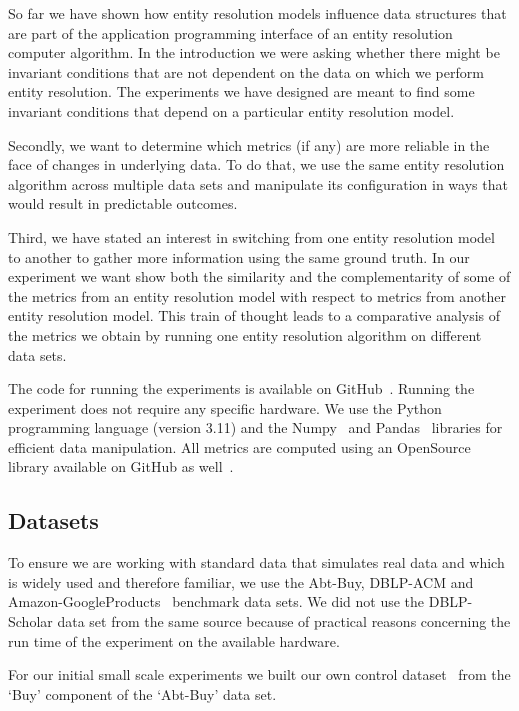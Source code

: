 So far we have shown how entity resolution models influence data structures
that are part of the application programming interface of an entity resolution
computer algorithm.
In the introduction we were asking whether there might be invariant conditions
that are not dependent on the data on which we perform entity resolution.
The experiments we have designed are meant to find some invariant conditions
that depend on a particular entity resolution model.

Secondly, we want to determine which metrics (if any) are more reliable in the
face of changes in underlying data.
To do that, we use the same entity resolution algorithm across multiple data
sets and manipulate its configuration in ways that would result in predictable
outcomes.

Third, we have stated an interest in switching from one entity resolution model
to another to gather more information using the same ground truth.
In our experiment we want show both the similarity and the complementarity of
some of the metrics from an entity resolution model with respect to metrics from
another entity resolution model.
This train of thought leads to a comparative analysis of the metrics we obtain
by running one entity resolution algorithm on different data sets.

The code for running the experiments is available on GitHub~\cite{matchescu}.
Running the experiment does not require any specific hardware.
We use the Python~\cite{python} programming language (version 3.11) and the
Numpy~\cite{numpy} and Pandas~\cite{pandas2023} libraries for efficient
data manipulation.
All metrics are computed using an OpenSource library available on GitHub as
well~\cite{matchescu-er-metrics2023}.

\subsection{Datasets}\label{subsec:Experiment Datasets}


To ensure we are working with standard data that simulates real data and which
is widely used and therefore familiar, we use the Abt-Buy, DBLP-ACM and
Amazon-GoogleProducts~\cite{vldb2010} benchmark data sets.
We did not use the DBLP-Scholar data set from the same source because of
practical reasons concerning the run time of the experiment on the available
hardware.

For our initial small scale experiments we built our own control
dataset~\cite{expdata2023} from the `Buy' component of the `Abt-Buy' data set.

